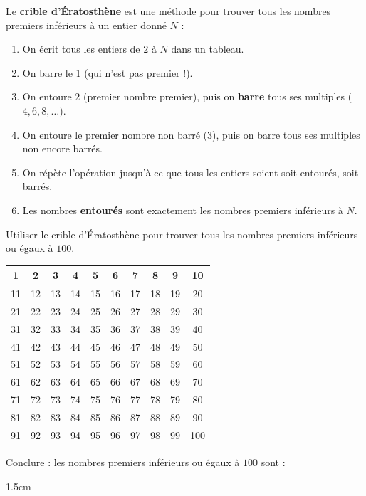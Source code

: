 \documentclass[a4paper]{book}
\begin{document}
    \begin{methode}
        Le \textbf{crible d'Ératosthène} est une méthode pour trouver tous les nombres premiers inférieurs à un entier donné $N$ :
        \begin{enumerate}
            \item On écrit tous les entiers de $2$ à $N$ dans un tableau.
            \item On barre le 1 (qui n'est pas premier !).
            \item On entoure $2$ (premier nombre premier), puis on \textbf{barre} tous ses multiples ($4, 6, 8, \ldots$).
            \item On entoure le premier nombre non barré ($3$), puis on barre tous ses multiples non encore barrés.
            \item On répète l'opération jusqu'à ce que tous les entiers soient soit entourés, soit barrés.
            \item Les nombres \textbf{entourés} sont exactement les nombres premiers inférieurs à $N$.
        \end{enumerate}
    \end{methode}

    \begin{exemple}
        Utiliser le crible d'Ératosthène pour trouver tous les nombres premiers inférieurs ou égaux à $100$.

        \medskip
        \begin{center}
        \renewcommand{\arraystretch}{1.8}
        \begin{tabular}{|c|c|c|c|c|c|c|c|c|c|}
        \hline
         1  &  2  &  3  &  4  &  5  &  6  &  7  &  8  &  9  &  10 \\ \hline
        11  & 12  & 13  & 14  & 15  & 16  & 17  & 18  & 19  &  20 \\ \hline
        21  & 22  & 23  & 24  & 25  & 26  & 27  & 28  & 29  &  30 \\ \hline
        31  & 32  & 33  & 34  & 35  & 36  & 37  & 38  & 39  &  40 \\ \hline
        41  & 42  & 43  & 44  & 45  & 46  & 47  & 48  & 49  &  50 \\ \hline
        51  & 52  & 53  & 54  & 55  & 56  & 57  & 58  & 59  &  60 \\ \hline
        61  & 62  & 63  & 64  & 65  & 66  & 67  & 68  & 69  &  70 \\ \hline
        71  & 72  & 73  & 74  & 75  & 76  & 77  & 78  & 79  &  80 \\ \hline
        81  & 82  & 83  & 84  & 85  & 86  & 87  & 88  & 89  &  90 \\ \hline
        91  & 92  & 93  & 94  & 95  & 96  & 97  & 98  & 99  & 100 \\ \hline
        \end{tabular}
        \end{center}

        \medskip
        Conclure : les nombres premiers inférieurs ou égaux à $100$ sont :
        \begin{ZoneReponse}{1.5cm}
        \end{ZoneReponse}
    \end{exemple}
\end{document}
